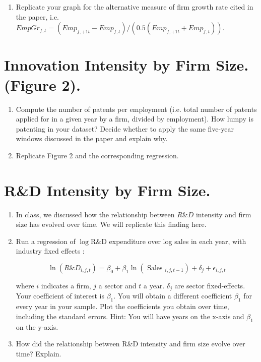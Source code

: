 \documentclass[12pt]{article}
\begin{document}
\begin{enumerate}[leftmargin=0pt, label=\textbf{(\alph*)}]
\item Replicate your graph for the alternative measure of firm growth rate cited in the paper, i.e. $E m p G r_{f, t}=\left(E m p_{f,+1 t}-E m p_{f, t}\right) /\left(0.5\left(E m p_{f,+1 t}+E m p_{f, t}\right)\right)$.

\end{enumerate}


\FloatBarrier
\section{Innovation Intensity by Firm Size. (Figure 2).}

\begin{enumerate}[leftmargin=0pt, label=\textbf{(\alph*)}]


\item Compute the number of patents per employment (i.e. total number of patents applied for in a given year by a firm, divided by employment). How lumpy is patenting in your dataset? Decide whether to apply the same five-year windows discussed in the paper and explain why.

\item Replicate Figure 2 and the corresponding regression.

\end{enumerate}

\section{R\&D Intensity by Firm Size.}

\begin{enumerate}[leftmargin=0pt, label=\textbf{(\alph*)}]

\item In class, we discussed how the relationship between $R \& D$ intensity and firm size has evolved over time. We will replicate this finding here.

\item Run a regression of $\log \mathrm{R} \& \mathrm{D}$ expenditure over log sales in each year, with industry fixed effects :

\begin{equation*}
\ln \left(R \& D_{i, j, t}\right)=\beta_{0}+\beta_{1} \ln \left(\text { Sales }_{i, j, t-1}\right)+\delta_{j}+\epsilon_{i, j, t}
\end{equation*}

where $i$ indicates a firm, $j$ a sector and $t$ a year. $\delta_{j}$ are sector fixed-effects. Your coefficient of interest is $\beta_{1}$. You will obtain a different coefficient $\beta_{1}$ for every year in your sample. Plot the coefficients you obtain over time, including the standard errors. Hint: You will have years on the $\mathrm{x}$-axis and $\beta_{1}$ on the $\mathrm{y}$-axis.

\item How did the relationship between R\&D intensity and firm size evolve over time? Explain.
\end{enumerate}
\end{document}
